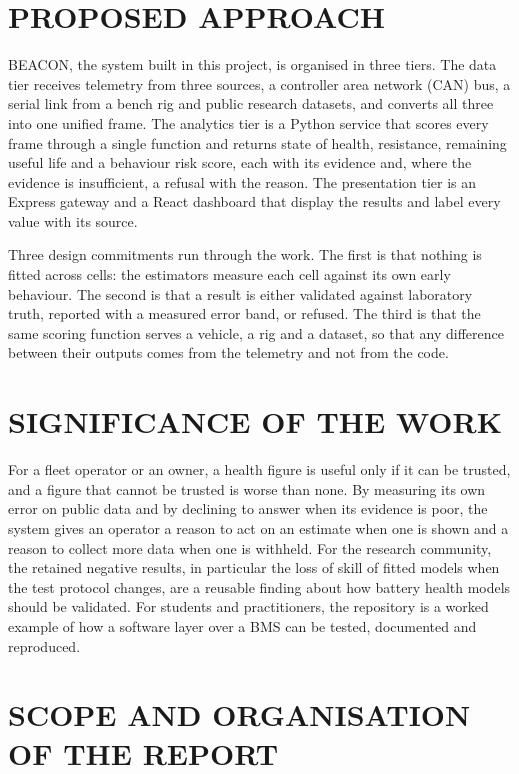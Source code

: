 \documentclass[12pt,a4paper]{amritareport}
\begin{document}
\section{PROPOSED APPROACH}

BEACON, the system built in this project, is organised in three tiers. The data tier receives telemetry from three sources, a controller area network (CAN) bus, a serial link from a bench rig and public research datasets, and converts all three into one unified frame. The analytics tier is a Python service that scores every frame through a single function and returns state of health, resistance, remaining useful life and a behaviour risk score, each with its evidence and, where the evidence is insufficient, a refusal with the reason. The presentation tier is an Express gateway and a React dashboard that display the results and label every value with its source.

Three design commitments run through the work. The first is that nothing is fitted across cells: the estimators measure each cell against its own early behaviour. The second is that a result is either validated against laboratory truth, reported with a measured error band, or refused. The third is that the same scoring function serves a vehicle, a rig and a dataset, so that any difference between their outputs comes from the telemetry and not from the code.

\section{SIGNIFICANCE OF THE WORK}

For a fleet operator or an owner, a health figure is useful only if it can be trusted, and a figure that cannot be trusted is worse than none. By measuring its own error on public data and by declining to answer when its evidence is poor, the system gives an operator a reason to act on an estimate when one is shown and a reason to collect more data when one is withheld. For the research community, the retained negative results, in particular the loss of skill of fitted models when the test protocol changes, are a reusable finding about how battery health models should be validated. For students and practitioners, the repository is a worked example of how a software layer over a BMS can be tested, documented and reproduced.

\section{SCOPE AND ORGANISATION OF THE REPORT}
\end{document}
